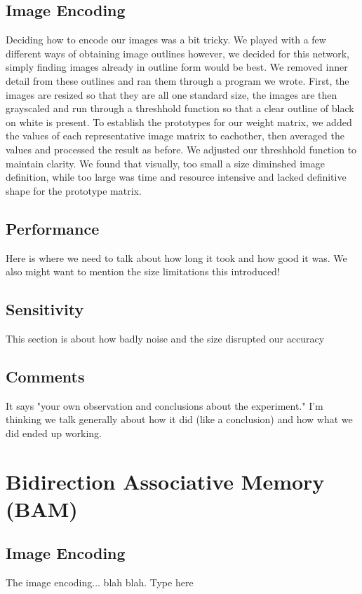 \documentclass{article}
\begin{document}
\subsection{Image Encoding}
Deciding how to encode our images was a bit tricky.  We played with a few different ways of obtaining image outlines however, we decided for this network, simply finding images already in outline form would be best.  We removed inner detail from these outlines and ran them through a program we wrote.  First, the images are resized so that they are all one standard size,  the images are then grayscaled and run through a threshhold function so that a clear outline of black on white is present.  To establish the prototypes for our weight matrix, we added the values of each representative image matrix to eachother, then averaged the values and processed the result as before.  We adjusted our threshhold function to maintain clarity.  We found that visually, too small a size diminshed image definition, while too large was time and resource intensive and lacked definitive shape for the prototype matrix.

\subsection{Performance}
Here is where we need to talk about how long it took and how good it was. We
also might want to mention the size limitations this introduced!

\subsection{Sensitivity}
This section is about how badly noise and the size disrupted our accuracy

\subsection{Comments}
It says "your own observation and conclusions about the experiment."
I'm thinking we talk generally about how it did (like a conclusion) and how
what we did ended up working.




\section{Bidirection Associative Memory (BAM)}

\subsection{Image Encoding}
The image encoding... blah blah. Type here
\end{document}
